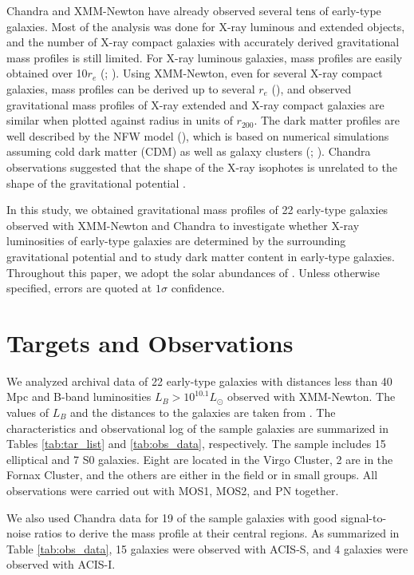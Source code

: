 \documentclass[structabstract]{aa}
\begin{document}
Chandra and XMM-Newton have already observed several tens of
early-type galaxies. Most of the analysis was done for X-ray luminous
and extended objects, and the number of X-ray compact galaxies with
accurately derived gravitational mass profiles is still limited. For
X-ray luminous galaxies, mass profiles are easily obtained over 10$r_e$
(\citealt{Fuka2006}; \citealt{Hump2006}). Using XMM-Newton, even
for several X-ray compact galaxies, mass profiles can be derived up to
several $r_e$ (\citealt{Fuka2006}), and observed gravitational mass
profiles of X-ray extended and X-ray compact galaxies are similar when
plotted against radius in units of $r_{200}$. The dark matter profiles are
well described by the NFW model (\citealt{Nava1996,Nava1997}), which is
based on numerical simulations assuming cold dark
matter (CDM) as well as galaxy clusters (\citealt{Fuka2006}; \citealt{Zapp2006}). 
Chandra observations suggested that the
shape of the X-ray isophotes is unrelated to the shape of the
gravitational potential \citep{Dieh2007,Dieh2008}.

In this study, we obtained gravitational mass profiles of 22
early-type galaxies observed with XMM-Newton and Chandra to
investigate whether X-ray luminosities of early-type galaxies are
determined by the surrounding gravitational potential and to study
dark matter content in early-type galaxies. Throughout this paper, we
adopt the solar abundances of \citet{Ande1989}. Unless
otherwise specified, errors are quoted at $1\sigma$ confidence.

\section{Targets and Observations}

We analyzed archival data of 22 early-type galaxies with distances
less than 40 Mpc and B-band luminosities $L_B>10^{10.1}L_{\odot}$
observed with XMM-Newton. The values of $L_B$ and the
distances to the galaxies are taken from \citet{Tully1988}. The
characteristics and observational log of the sample galaxies are
summarized in Tables \ref{tab:tar_list} and \ref{tab:obs_data},
respectively. The sample includes 15 elliptical and 7 S0
galaxies. Eight are located in the Virgo Cluster, 2 are in the Fornax
Cluster, and the others are either in the field or in small
groups. All observations were carried out with MOS1, MOS2, and PN
together. 

We also used Chandra data for 19 of the sample galaxies with good
signal-to-noise ratios to derive the mass profile at their central
regions. As summarized in Table \ref{tab:obs_data}, 15 galaxies were
observed with ACIS-S, and 4 galaxies were observed with ACIS-I. 
\end{document}

